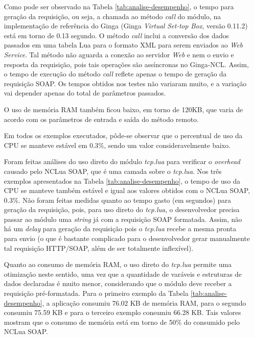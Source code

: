 Como pode ser observado na Tabela \ref{tab:analise-desempenho},
o tempo para geração da requisição, ou seja, a chamada ao método \textit{call}
do módulo, na implementação de referência do Ginga (Ginga \textit{Virtual Set-top Box}, versão 0.11.2)
está em torno de 0.13 segundo. O método \textit{call} inclui a conversão dos dados passados em uma tabela Lua
para o formato XML para serem enviados ao \textit{Web Service}. Tal método não aguarda 
a conexão ao servidor \textit{Web} e nem o envio e resposta da requisição, pois tais
operações são assíncronas no Ginga-NCL. Assim, o tempo de execução
do método \textit{call} reflete apenas o tempo de geração da requisição SOAP. 
Os tempos obtidos nos testes não variaram muito,
e a variação vai depender apenas do total de parâmetros passados.

O uso de memória RAM também ficou baixo, em torno de 120KB, que varia de acordo com
os parâmetros de entrada e saída do método remoto.

Em todos os exemplos executados, pôde-se observar que o percentual de uso da CPU se 
manteve estável em 0.3\%, sendo um valor consideravelmente baixo.

Foram feitas análises do uso direto do módulo \textit{tcp.lua} para verificar o \textit{overhead}
causado pelo NCLua SOAP, que é uma camada sobre o \textit{tcp.lua}. Nos três exemplos
apresentados na Tabela \ref{tab:analise-desempenho}, o tempo de uso da CPU se manteve também estável e igual
aos valores obtidos com o NCLua SOAP, 0.3\%.
Não foram feitas medidas quanto ao tempo gasto (em segundos) para geração da requisição, pois,
para uso direto do \textit{tcp.lua}, o desenvolvedor precisa passar ao módulo uma \textit{string} já com a requisição
SOAP formatada. Assim, não há um \textit{delay} para geração da requisição pois o \textit{tcp.lua}
recebe a mesma pronta para envio (o que é bastante complicado para o desenvolvedor
gerar manualmente tal requisição HTTP/SOAP, além de ser totalmente inflexível).

Quanto ao consumo de memória RAM, o uso direto do \textit{tcp.lua} permite uma otimização
neste sentido, uma vez que a quantidade de varáveis e estruturas de dados
declaradas é muito menor, considerando que o módulo deve receber a requisição
pré-formatada. Para o primeiro exemplo da Tabela \ref{tab:analise-desempenho},
a aplicação consumiu 76.02 KB de memória RAM, para o segundo consumiu 75.59 KB 
e para o terceiro exemplo consumiu 66.28 KB. Tais valores mostram que o consumo
de memória está em torno de 50\% do consumido pelo NCLua SOAP.

